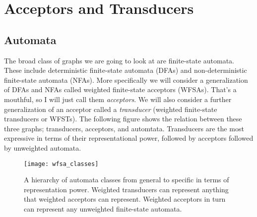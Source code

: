 \documentclass[main.tex]{subfiles}
\begin{document}
\section{Acceptors and Transducers}
\label{sec:acceptors_transducers}

\subsection{Automata}
\label{sec:automata}

The broad class of graphs we are going to look at are finite-state automata.
These include deterministic finite-state automata (DFAs) and non-deterministic
finite-state automata (NFAs). More specifically we will consider a
generalization of DFAs and NFAs called weighted finite-state acceptors (WFSAs).
That's a mouthful, so I will just call them \emph{acceptors}. We will also consider
a further generalization of an acceptor called a \emph{transducer} (weighted
finite-state transducers or WFSTs). The following figure shows the relation
between these three graphs; transducers, acceptors, and automtata. Transducers
are the most expressive in terms of their representational power, followed by
acceptors followed by unweighted automata.

\begin{figure}
    \centering
    \texttt{[image: wfsa\_classes]}
    \caption{A hierarchy of automata classes from general to specific in terms
    of representation power. Weighted transducers can represent anything that
    weighted acceptors can represent. Weighted acceptors in turn can represent
    any unweighted finite-state automata.}
    \label{fig:wfsa_classes}
\end{figure}
\end{document}
